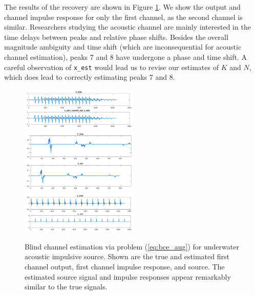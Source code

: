 \documentclass[journal]{IEEEtran}
\begin{document}
The results of the recovery are shown in Figure \ref{fig:bce_rec}.  We show the output and channel impulse response for only the first channel, as the second channel is similar.  Researchers studying the acoustic channel are mainly interested in the time delays between peaks and relative phase shifts.  Besides the overall magnitude ambiguity and time shift (which are inconsequential for acoustic channel estimation), peaks 7 and 8 have undergone a phase and time shift.  A careful observation of \texttt{x\_est} would lead us to revise our estimates of $K$ and $N$, which does lead to correctly estimating peaks 7 and 8.\\

\begin{figure}
   \centering
   \includegraphics[width=0.5\textwidth]{figures/bce_rec_003_x_trim.pdf}
   \includegraphics[width=0.5\textwidth]{figures/bce_rec_003_h_trim.pdf}
   \includegraphics[width=0.5\textwidth]{figures/bce_rec_003_s_trim.pdf}
   \caption{Blind channel estimation via problem (\ref{eq:bce_aug}) for underwater acoustic impulsive source.  Shown are the true and estimated first channel output, first channel impulse response, and source.  The estimated source signal and impulse responses appear remarkably similar to the true signals.}
   \label{fig:bce_rec}
\end{figure}
\end{document}
